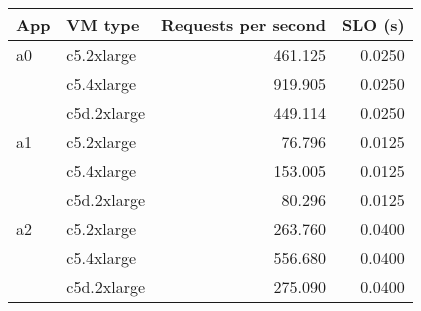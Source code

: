 \begin{tabular}{llrr}
\toprule
App & VM type & Requests per second & SLO (s) \\
\midrule
a0 & c5.2xlarge &461.125&0.0250\\
 & c5.4xlarge &919.905&0.0250\\
 & c5d.2xlarge &449.114&0.0250\\
\midrule
a1 & c5.2xlarge &76.796&0.0125\\
 & c5.4xlarge &153.005&0.0125\\
 & c5d.2xlarge &80.296&0.0125\\
\midrule
a2 & c5.2xlarge &263.760&0.0400\\
 & c5.4xlarge &556.680&0.0400\\
 & c5d.2xlarge &275.090&0.0400\\
\bottomrule
\end{tabular}

